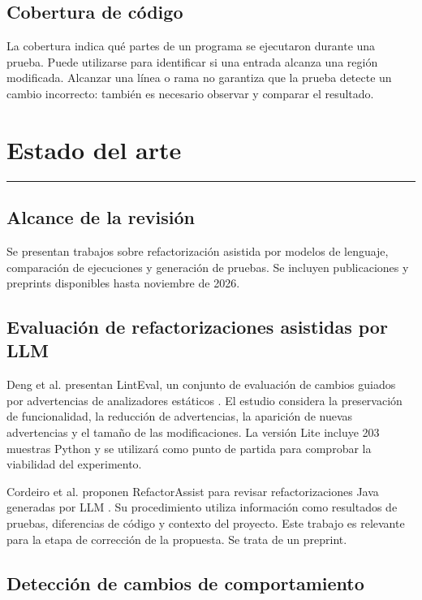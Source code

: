 \documentclass[11pt,openright,final]{unsa}
\begin{document}
\section{Cobertura de código}

La cobertura indica qué partes de un programa se ejecutaron durante una prueba. Puede utilizarse para identificar si una entrada alcanza una región modificada. Alcanzar una línea o rama no garantiza que la prueba detecte un cambio incorrecto: también es necesario observar y comparar el resultado.

\chapter{Estado del arte}
\hrule\bigskip\vspace*{1cm}

\section{Alcance de la revisión}

Se presentan trabajos sobre refactorización asistida por modelos de lenguaje, comparación de ejecuciones y generación de pruebas. Se incluyen publicaciones y preprints disponibles hasta noviembre de 2026.

\section{Evaluación de refactorizaciones asistidas por LLM}

Deng et al. presentan LintEval, un conjunto de evaluación de cambios guiados por advertencias de analizadores estáticos \cite{ref1}. El estudio considera la preservación de funcionalidad, la reducción de advertencias, la aparición de nuevas advertencias y el tamaño de las modificaciones. La versión Lite incluye 203 muestras Python \cite{ref7} y se utilizará como punto de partida para comprobar la viabilidad del experimento.

Cordeiro et al. proponen RefactorAssist para revisar refactorizaciones Java generadas por LLM \cite{ref3}. Su procedimiento utiliza información como resultados de pruebas, diferencias de código y contexto del proyecto. Este trabajo es relevante para la etapa de corrección de la propuesta. Se trata de un preprint.

\section{Detección de cambios de comportamiento}
\end{document}
